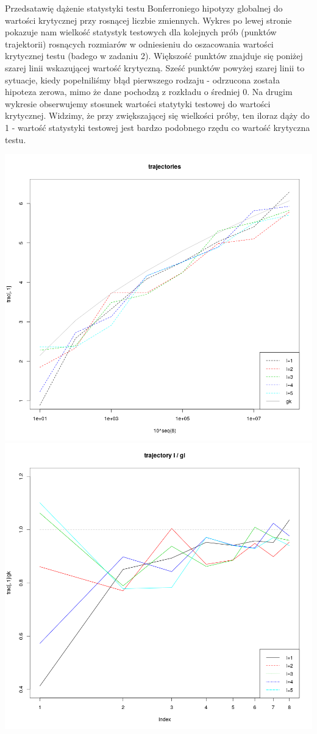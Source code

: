 \documentclass[a4paper,11pt]{article}
\begin{document}
Przedsatawię dążenie statystyki testu Bonferroniego hipotyzy globalnej do wartości krytycznej przy rosnącej liczbie zmiennych. Wykres po lewej stronie pokazuje nam wielkość statystyk testowych dla kolejnych prób (punktów trajektorii) rosnących rozmiarów w odniesieniu do oszacowania wartości krytycznej testu (badego w zadaniu 2). Większość punktów znajduje się poniżej szarej linii wskazującej wartość krytyczną. Sześć punktów powyżej szarej linii to sytuacje, kiedy popełniliśmy błąd pierwszego rodzaju - odrzucona została hipoteza zerowa, mimo że dane pochodzą z rozkładu o średniej 0. Na drugim wykresie obserwujemy stosunek wartości statytyki testowej do wartości krytycznej. Widzimy, że przy zwiększającej się wielkości próby, ten iloraz dąży do 1 - wartość statystyki testowej jest bardzo podobnego rzędu co wartość krytyczna testu.  

\includegraphics[scale=.3]{plot5.png} 
\includegraphics[scale=.3]{plot6.png}
\end{document}
